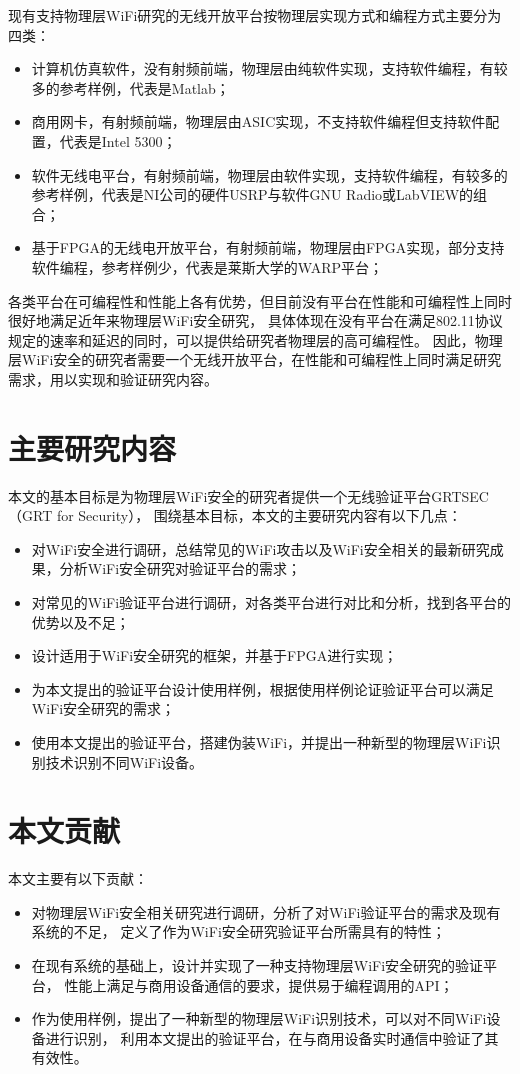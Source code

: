 		现有支持物理层WiFi研究的无线开放平台按物理层实现方式和编程方式主要分为四类：
		\begin{itemize}
			\item 计算机仿真软件，没有射频前端，物理层由纯软件实现，支持软件编程，有较多的参考样例，代表是Matlab；
			\item 商用网卡，有射频前端，物理层由ASIC实现，不支持软件编程但支持软件配置，代表是Intel 5300；
			\item 软件无线电平台，有射频前端，物理层由软件实现，支持软件编程，有较多的参考样例，代表是NI公司的硬件USRP与软件GNU Radio或LabVIEW的组合；
			\item 基于FPGA的无线电开放平台，有射频前端，物理层由FPGA实现，部分支持软件编程，参考样例少，代表是莱斯大学的WARP平台；
		\end{itemize}

		各类平台在可编程性和性能上各有优势，但目前没有平台在性能和可编程性上同时很好地满足近年来物理层WiFi安全研究，
		具体体现在没有平台在满足802.11协议规定的速率和延迟的同时，可以提供给研究者物理层的高可编程性。
		因此，物理层WiFi安全的研究者需要一个无线开放平台，在性能和可编程性上同时满足研究需求，用以实现和验证研究内容。

	\section{主要研究内容}
		本文的基本目标是为物理层WiFi安全的研究者提供一个无线验证平台GRTSEC（GRT for Security），
		围绕基本目标，本文的主要研究内容有以下几点：
		\begin{itemize}
			\item 对WiFi安全进行调研，总结常见的WiFi攻击以及WiFi安全相关的最新研究成果，分析WiFi安全研究对验证平台的需求；
			\item 对常见的WiFi验证平台进行调研，对各类平台进行对比和分析，找到各平台的优势以及不足；
			\item 设计适用于WiFi安全研究的框架，并基于FPGA进行实现；
			\item 为本文提出的验证平台设计使用样例，根据使用样例论证验证平台可以满足WiFi安全研究的需求；
			\item 使用本文提出的验证平台，搭建伪装WiFi，并提出一种新型的物理层WiFi识别技术识别不同WiFi设备。
		\end{itemize}

	\section{本文贡献}
		本文主要有以下贡献：
		\begin{itemize}
			\item 对物理层WiFi安全相关研究进行调研，分析了对WiFi验证平台的需求及现有系统的不足，
			定义了作为WiFi安全研究验证平台所需具有的特性；
			\item 在现有系统的基础上，设计并实现了一种支持物理层WiFi安全研究的验证平台，
			性能上满足与商用设备通信的要求，提供易于编程调用的API；
			\item 作为使用样例，提出了一种新型的物理层WiFi识别技术，可以对不同WiFi设备进行识别，
			利用本文提出的验证平台，在与商用设备实时通信中验证了其有效性。
		\end{itemize}

